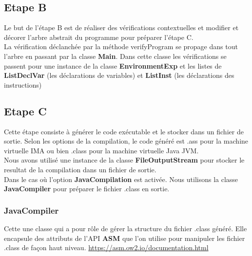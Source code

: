 \documentclass[12pt, a4paper, one side]{article}
\begin{document}
    \subsection{Etape B}
    Le but de l'étape B est de réaliser des vérifications contextuelles et modifier et décorer l'arbre abstrait du programme pour préparer l'étape C.
    \\
    La vérification déclanchée par la méthode verifyProgram se propage dans tout l'arbre en passant par la classe \textbf{Main}. Dans cette classe les vérifications se passent pour une instance de la classe \textbf{EnvironmentExp} et les listes de \textbf{ListDeclVar} (les déclarations de variables) et \textbf{ListInst} (les déclarations des instructions)

    \subsection{Etape C}
    Cette étape consiste à générer le code exécutable et le stocker dans un fichier de sortie. Selon les options de la compilation, le code généré est .ass pour la machine virtuelle IMA ou bien .class pour la machine virtuelle Java JVM.
    \\
    Nous avons utilisé une instance de la classe \textbf{FileOutputStream} pour stocker le resultat de la compilation dans un fichier de sortie.\\
    Dans le cas où l'option \textbf{JavaCompilation} est activée. Nous utilisons la classe \textbf{JavaCompiler} pour préparer le fichier .class en sortie.

    \subsubsection{JavaCompiler}
    Cette une classe qui a pour rôle de gérer la structure du fichier .class généré. Elle encapsule des attributs de l'API \textbf{ASM} que l'on utilise pour manipuler les fichier .class de façon haut niveau. \url{https://asm.ow2.io/documentation.html}
\end{document}
